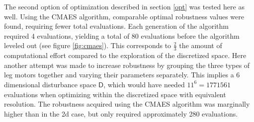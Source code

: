     The second option of optimization described in section \ref{opt} was tested here as well. Using the CMAES algorithm, comparable optimal robustness values were found, requiring fewer total evaluations. Each generation of the algorithm required 4 evaluations, yielding a total of 80 evaluations before the algorithm leveled out (see figure \ref{fig:cmaes}). This corresponds to $\frac{2}{3}$ the amount of computational effort compared to the exploration of the discretized space. 
    Here another attempt was made to increase robustness by grouping the three types of leg motors together and varying their parameters separately. This implies a 6 dimensional disturbance space $\mathsf{D}$, which would have needed $11^6=1771561$ evaluations when optimizing within the discretized space with equivalent resolution. The robustness acquired using the CMAES algorithm was marginally higher than in the 2d case, but only required approximately 280 evaluations.  















